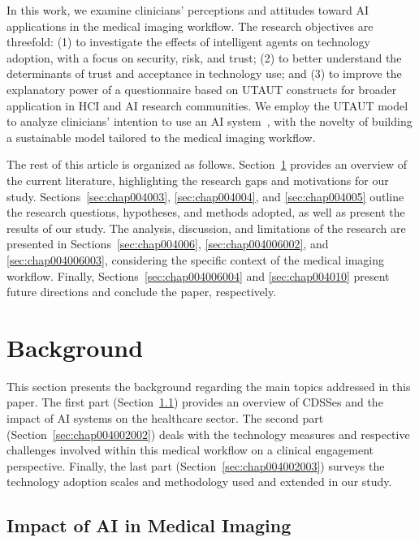 In this work, we examine clinicians' perceptions and attitudes toward \ac{AI} applications in the medical imaging workflow.
The research objectives are threefold:
(1) to investigate the effects of intelligent agents on technology adoption, with a focus on security, risk, and trust;
(2) to better understand the determinants of trust and acceptance in technology use; and
(3) to improve the explanatory power of a questionnaire based on \ac{UTAUT} constructs for broader application in \ac{HCI} and \ac{AI} research communities.
We employ the \ac{UTAUT} model to analyze clinicians' intention to use an \ac{AI} system~\cite{BOOTSMAN201999, DEANGELI2020102412, HART201993, HOEHLE201635, LOOIJE2010386, MCGLYNN201733, MOORE2022102784}, with the novelty of building a sustainable model tailored to the medical imaging workflow.

The rest of this article is organized as follows.
Section~\ref{sec:chap004002} provides an overview of the current literature, highlighting the research gaps and motivations for our study.
Sections~\ref{sec:chap004003}, \ref{sec:chap004004}, and \ref{sec:chap004005} outline the research questions, hypotheses, and methods adopted, as well as present the results of our study.
The analysis, discussion, and limitations of the research are presented in Sections~\ref{sec:chap004006}, \ref{sec:chap004006002}, and \ref{sec:chap004006003}, considering the specific context of the medical imaging workflow.
Finally, Sections~\ref{sec:chap004006004} and \ref{sec:chap004010} present future directions and conclude the paper, respectively.

\section{Background}
\label{sec:chap004002}

This section presents the background regarding the main topics addressed in this paper.
The first part (Section~\ref{sec:chap004002001}) provides an overview of \acp{CDSSe} and the impact of \ac{AI} systems on the healthcare sector.
The second part (Section~\ref{sec:chap004002002}) deals with the technology measures and respective challenges involved within this medical workflow on a clinical engagement perspective.
Finally, the last part (Section~\ref{sec:chap004002003}) surveys the technology adoption scales and methodology used and extended in our study.

\subsection{Impact of AI in Medical Imaging}
\label{sec:chap004002001}

